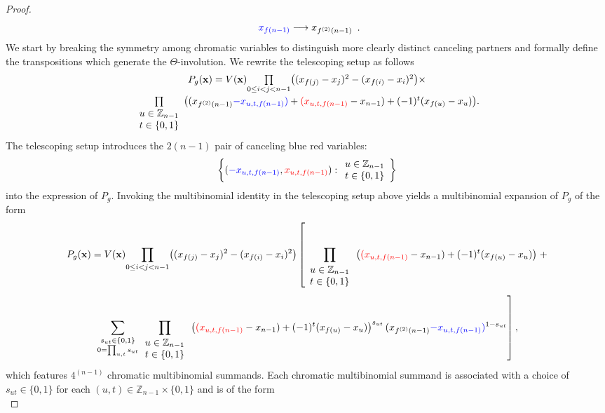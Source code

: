 \begin{proof}
\[\begin{array}{c}
{\color{blue}x_{f(n-1)}}\longrightarrow x_{f^{(2)}(n-1)}
\end{array}.
\]
We start by breaking the symmetry among chromatic variables to distinguish more clearly distinct canceling partners and formally define the transpositions which generate the $\Theta$-involution. We rewrite the telescoping setup as follows
\[
\begin{array}{c}
P_{g}(\mathbf{x})=V(\mathbf{x})\underset{0\le i<j<n-1}{\prod}\big((x_{f(j)}-x_{j})^{2}-(x_{f(i)}-x_{i})^{2}\big)\times\\[10pt]
\underset{\begin{array}{c}
u\in\mathbb{Z}_{n-1}\\
t\in\{0,1\}
\end{array}}{\prod}\big((x_{f^{(2)}(n-1)}{\color{blue}-x_{u,t,f(n-1)}}{\color{blue})}+{\color{red}(x_{u,t,f(n-1)}}-x_{n-1})+(-1)^{t}(x_{f(u)}-x_{u})\big).\\[10pt]
\end{array}
\]
The telescoping setup introduces  the $2(n-1)$ pair of canceling blue red variables:
\[
\bigg\{({\color{blue}-x_{u,t,f(n-1)}},{\color{red}x_{u,t,f(n-1)}}):\begin{array}{c}
u\in\mathbb{Z}_{n-1}\\
t\in\{0,1\}
\end{array}\bigg\}
\]
into the expression of $P_g$. Invoking the multibinomial identity in the telescoping setup above yields a multibinomial expansion of $P_{g}$ of the form
\[
P_{g}(\mathbf{x})=V(\mathbf{x})\underset{0\le i<j<n-1}{\prod}\big((x_{f(j)}-x_{j})^{2}-(x_{f(i)}-x_{i})^{2}\big)\left[\prod_{\begin{array}{c}
u\in\mathbb{Z}_{n-1}\\
t\in\{0,1\}
\end{array}}\big({\color{red}(x_{u,t,f(n-1)}}-x_{n-1})+(-1)^{t}(x_{f(u)}-x_{u})\big)\right.+
\]
\[
\left.\sum_{\substack{s_{ut}\in\{0,1\}\\
0=\prod_{u,t}s_{ut}
}
}\prod_{\begin{array}{c}
u\in\mathbb{Z}_{n-1}\\
t\in\{0,1\}
\end{array}}\big({\color{red}(x_{u,t,f(n-1)}}-x_{n-1})+(-1)^{t}(x_{f(u)}-x_{u})\big)^{s_{ut}}\,(x_{f^{(2)}(n-1)}{\color{blue}-x_{u,t,f(n-1)}}{\color{blue})}^{1-s_{ut}}\right],
\]
which features $4^{(n-1)}$ chromatic multibinomial summands. Each chromatic multibinomial summand is associated with a choice of $s_{ut}\in\{0,1\}$ for each $(u,t)\in\mathbb{Z}_{n-1}\times\{0,1\}$ and is of the form
\[
\]
\end{proof}
